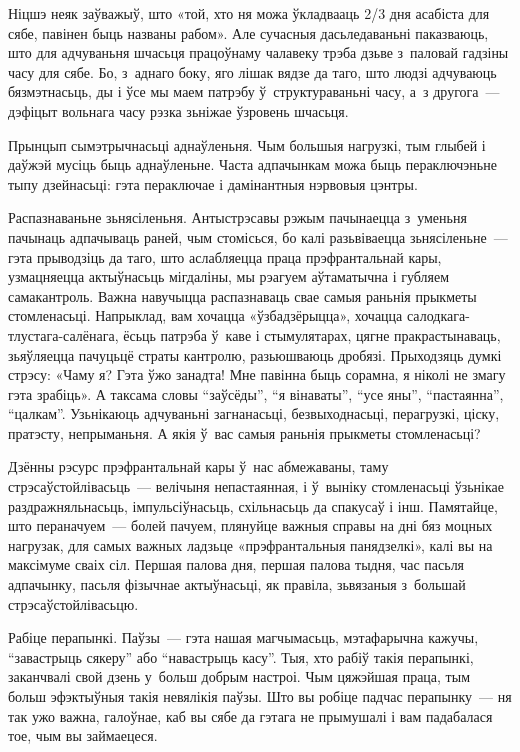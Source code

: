 Ніцшэ неяк заўважыў, што «той, хто ня можа ўкладвааць 2/3 дня асабіста для сябе, павінен быць названы рабом». Але сучасныя дасьледаваньні паказваюць, што для адчуваньня шчасьця працоўнаму чалавеку трэба дзьве з~паловай гадзіны часу для сябе. Бо, з~аднаго боку, яго лішак вядзе да таго, што людзі адчуваюць бязмэтнасьць, ды і ўсе мы маем патрэбу ў~структураваньні часу, а~з другога~--- дэфіцыт вольнага часу рэзка зьніжае ўзровень шчасьця.

Прынцып сымэтрычнасьці аднаўленьня. Чым большыя нагрузкі, тым глыбей і даўжэй мусіць быць аднаўленьне. Часта адпачынкам можа быць пераключэньне тыпу дзейнасьці: гэта пераключае і дамінантныя нэрвовыя цэнтры.

Распазнаваньне зьнясіленьня. Антыстрэсавы рэжым пачынаецца з~уменьня пачынаць адпачываць раней, чым стомісься, бо калі разьвіваецца зьнясіленьне~--- гэта прыводзіць да таго, што аслабляецца праца прэфрантальнай кары, узмацняецца актыўнасьць мігдаліны, мы рэагуем аўтаматычна і губляем самакантроль. Важна навучыцца распазнаваць свае самыя раньнія прыкметы стомленасьці. Напрыклад, вам хочацца «ўзбадзёрыцца», хочацца салодкага-тлустага-салёнага, ёсьць патрэба ў~каве і стымулятарах, цягне пракрастынаваць, зьяўляецца пачуцьцё страты кантролю, разьюшваюць дробязі. Прыходзяць думкі стрэсу: «Чаму я? Гэта ўжо занадта! Мне павінна быць сорамна, я ніколі не змагу гэта зрабіць». А таксама словы ``заўсёды'', ``я вінаваты'', ``усе яны'', ``пастаянна'', ``цалкам''. Узьнікаюць адчуваньні загнанасьці, безвыходнасьці, перагрузкі, ціску, пратэсту, непрыманьня. А якія ў~вас самыя раньнія прыкметы стомленасьці?

Дзённы рэсурс прэфрантальнай кары ў~нас абмежаваны, таму стрэсаўстойлівасьць~--- велічыня непастаянная, і ў~выніку стомленасьці ўзьнікае раздражняльнасьць, імпульсіўнасьць, схільнасьць да спакусаў і інш. Памятайце, што пераначуем~--- болей пачуем, плянуйце важныя справы на дні бяз моцных нагрузак, для самых важных ладзьце «прэфрантальныя панядзелкі», калі вы на максімуме сваіх сіл. Першая палова дня, першая палова тыдня, час пасьля адпачынку, пасьля фізычнае актыўнасьці, як правіла, зьвязаныя з~большай стрэсаўстойлівасьцю.

Рабіце перапынкі. Паўзы~--- гэта нашая магчымасьць, мэтафарычна кажучы, ``завастрыць сякеру'' або ``навастрыць касу''. Тыя, хто рабіў такія перапынкі, заканчвалі свой дзень у~больш добрым настроі. Чым цяжэйшая праца, тым больш эфэктыўныя такія невялікія паўзы. Што вы робіце падчас перапынку~--- ня так ужо важна, галоўнае, каб вы сябе да гэтага не прымушалі і вам падабалася тое, чым вы займаецеся.

